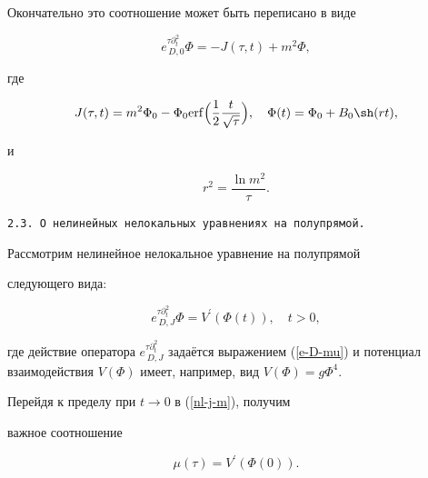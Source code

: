 Окончательно это соотношение может быть переписано в виде

\begin{equation*}

e^{\tau\partial^2_t}_{\,D,0}\Phi=-J(\tau,t)+m^2\Phi, 


\end{equation*}

где

\begin{gather*}


J(\tau,t)=m^2\Phi_0-\Phi_0{\mathop{\rm erf}\nolimits}\Bigl(\frac{1}{2}\frac{t}{\sqrt{\tau}}\Bigr),

\quad 

\Phi(t)=\Phi_0+B_0 \sh (rt),%

\end{gather*}

и

\begin{equation*}

r^2=\frac{\ln m^2}{\tau}.

\end{equation*}



\smallskip

{\tt 2.3. О нелинейных нелокальных уравнениях на полупрямой.}

Рассмотрим нелинейное нелокальное уравнение на полупрямой

следующего вида:

\begin{equation}

e^{\tau\partial^2_t}_{\,D,J}\Phi=V^\prime (\Phi(t)), \quad t>0,\label{nl-j-m}

\end{equation}

 где действие оператора $e^{\tau\partial^2_t}_{\,D,J}$ задаётся выражением (\ref{e-D-mu}) и потенциал взаимодействия $V(\Phi)$ имеет, например, вид $V(\Phi)=g\Phi^4$.

Перейдя к пределу при $t\to 0$ в (\ref{nl-j-m}), получим

важное соотношение

\begin{equation}\label{DG}

\mu(\tau)=V^\prime (\Phi(0)).

\end{equation}

